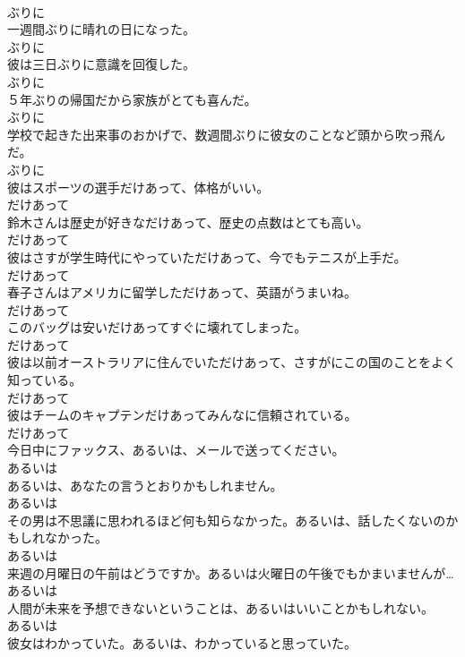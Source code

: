 \documentclass[8pt]{extreport}
\begin{document}
\begin{CJK}{UTF8}{min}
\\	ぶりに
\\	一週間ぶりに晴れの日になった。	
\\	ぶりに
\\	彼は三日ぶりに意識を回復した。	
\\	ぶりに
\\	５年ぶりの帰国だから家族がとても喜んだ。	
\\	ぶりに
\\	学校で起きた出来事のおかげで、数週間ぶりに彼女のことなど頭から吹っ飛んだ。	
\\	ぶりに
\\	彼はスポーツの選手だけあって、体格がいい。	
\\	だけあって
\\	鈴木さんは歴史が好きなだけあって、歴史の点数はとても高い。	
\\	だけあって
\\	彼はさすが学生時代にやっていただけあって、今でもテニスが上手だ。	
\\	だけあって
\\	春子さんはアメリカに留学しただけあって、英語がうまいね。	
\\	だけあって
\\	このバッグは安いだけあってすぐに壊れてしまった。	
\\	だけあって
\\	彼は以前オーストラリアに住んでいただけあって、さすがにこの国のことをよく知っている。	
\\	だけあって
\\	彼はチームのキャプテンだけあってみんなに信頼されている。	
\\	だけあって
\\	今日中にファックス、あるいは、メールで送ってください。	
\\	あるいは
\\	あるいは、あなたの言うとおりかもしれません。	
\\	あるいは
\\	その男は不思議に思われるほど何も知らなかった。あるいは、話したくないのかもしれなかった。	
\\	あるいは
\\	来週の月曜日の午前はどうですか。あるいは火曜日の午後でもかまいませんが…	
\\	あるいは
\\	人間が未来を予想できないということは、あるいはいいことかもしれない。	
\\	あるいは
\\	彼女はわかっていた。あるいは、わかっていると思っていた。	

\end{CJK}
\end{document}

